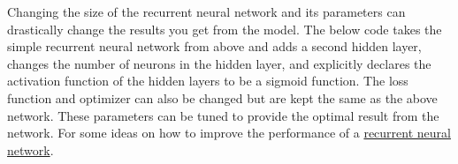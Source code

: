 \documentclass[%
oneside,                 %
final,                   %
10pt]{article}
\begin{document}
Changing the size of the recurrent neural network and its parameters
can drastically change the results you get from the model.  The below
code takes the simple recurrent neural network from above and adds a
second hidden layer, changes the number of neurons in the hidden
layer, and explicitly declares the activation function of the hidden
layers to be a sigmoid function.  The loss function and optimizer can
also be changed but are kept the same as the above network.  These
parameters can be tuned to provide the optimal result from the
network.  For some ideas on how to improve the performance of a
\href{{https://danijar.com/tips-for-training-recurrent-neural-networks}}{recurrent neural network}.
\end{document}
